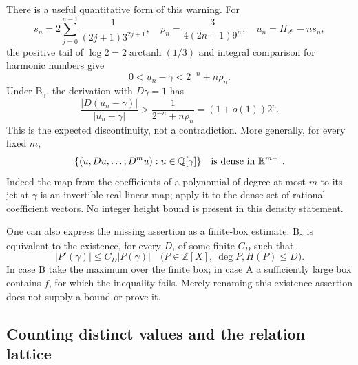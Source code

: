 \documentclass[11pt,a4paper]{article}
\newcommand{\Q}{\mathbb Q}
\newcommand{\R}{\mathbb R}
\newcommand{\Z}{\mathbb Z}
\theoremstyle{definition}
\theoremstyle{remark}
\numberwithin{equation}{section}
\begin{document}
There is a useful quantitative form of this warning. For
\begin{equation}\label{wr:eq-harmonic-approximant}
 s_n=2\sum_{j=0}^{n-1}\frac{1}{(2j+1)3^{2j+1}},\quad
 \rho_n=\frac{3}{4(2n+1)9^n},\quad
 u_n=H_{2^n}-ns_n,
\end{equation}
the positive tail of \(\log2=2\operatorname{arctanh}(1/3)\) and integral
comparison for harmonic numbers give
\begin{equation}\label{wr:eq-real-approx}
 0<u_n-\gamma<2^{-n}+n\rho_n.
\end{equation}
Under \(\mathrm B_\gamma\), the derivation with \(D\gamma=1\) has
\[
 \frac{|D(u_n-\gamma)|}{|u_n-\gamma|}
 >\frac1{2^{-n}+n\rho_n}=(1+o(1))2^n.
\]
This is the expected discontinuity, not a contradiction. More generally,
for every fixed \(m\),
\[
 \{(u,Du,\ldots,D^mu):u\in\Q[\gamma]\}
 \quad\hbox{is dense in }\R^{m+1}.
\]
Indeed the map from the coefficients of a polynomial of degree at most
\(m\) to its jet at \(\gamma\) is an invertible real linear map; apply it
to the dense set of rational coefficient vectors. No integer height
bound is present in this density statement.

One can also express the missing assertion as a finite-box estimate:
\(\mathrm B_\gamma\) is equivalent to the existence, for every \(D\), of
some finite \(C_D\) such that
\[
 |P'(\gamma)|\le C_D|P(\gamma)|
 \quad\bigl(P\in\Z[X],\ \deg P,H(P)\le D\bigr).
\]
In case B take the maximum over the finite box; in case A a sufficiently
large box contains \(f\), for which the inequality fails. Merely renaming
this existence assertion does not supply a bound or prove it.

\subsection{Counting distinct values and the relation lattice}
\end{document}
